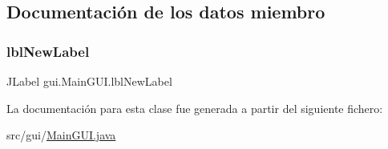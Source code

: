 \subsection{Documentación de los datos miembro}
\mbox{\label{classgui_1_1_main_g_u_i_a0fc72962f06022026150f3d01638f929}} 
\subsubsection{\texorpdfstring{lblNewLabel}{lblNewLabel}}
{\footnotesize\ttfamily J\+Label gui.\+Main\+G\+U\+I.\+lbl\+New\+Label\hspace{0.3cm}{\ttfamily [protected]}}



La documentación para esta clase fue generada a partir del siguiente fichero\+:\begin{DoxyCompactItemize}
\item 
src/gui/\mbox{\hyperlink{_main_g_u_i_8java}{Main\+G\+U\+I.\+java}}\end{DoxyCompactItemize}
